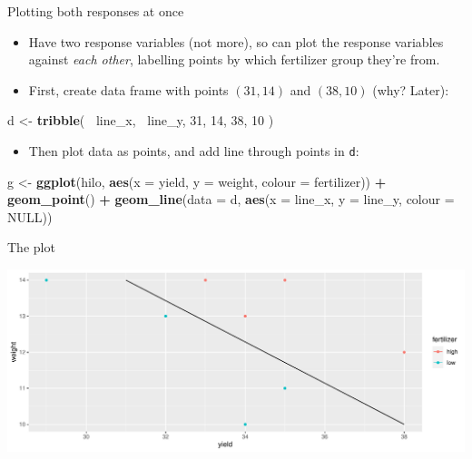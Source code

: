 \documentclass[
  ignorenonframetext,
]{beamer}
\newenvironment{Shaded}{\begin{snugshade}}{\end{snugshade}}
\newcommand{\DataTypeTok}[1]{\textcolor[rgb]{0.13,0.29,0.53}{#1}}
\newcommand{\DecValTok}[1]{\textcolor[rgb]{0.00,0.00,0.81}{#1}}
\newcommand{\KeywordTok}[1]{\textcolor[rgb]{0.13,0.29,0.53}{\textbf{#1}}}
\newcommand{\NormalTok}[1]{#1}
\newcommand{\OperatorTok}[1]{\textcolor[rgb]{0.81,0.36,0.00}{\textbf{#1}}}
\newcommand{\OtherTok}[1]{\textcolor[rgb]{0.56,0.35,0.01}{#1}}
\newcommand{\StringTok}[1]{\textcolor[rgb]{0.31,0.60,0.02}{#1}}
\providecommand{\tightlist}{%
  \setlength{\itemsep}{0pt}\setlength{\parskip}{0pt}}
\begin{document}
\begin{frame}[fragile]{Plotting both responses at once}
\protect\hypertarget{plotting-both-responses-at-once}{}

\begin{itemize}
\item
  Have two response variables (not more), so can plot the response
  variables against \emph{each other}, labelling points by which
  fertilizer group they're from.
\item
  First, create data frame with points \((31,14)\) and \((38,10)\) (why?
  Later):
\end{itemize}

\begin{Shaded}
\begin{Highlighting}[]
\NormalTok{d <-}\StringTok{ }\KeywordTok{tribble}\NormalTok{(}
  \OperatorTok{~}\NormalTok{line_x, }\OperatorTok{~}\NormalTok{line_y,}
  \DecValTok{31}\NormalTok{, }\DecValTok{14}\NormalTok{,}
  \DecValTok{38}\NormalTok{, }\DecValTok{10}
\NormalTok{)}
\end{Highlighting}
\end{Shaded}

\begin{itemize}
\tightlist
\item
  Then plot data as points, and add line through points in \texttt{d}:
\end{itemize}

\begin{Shaded}
\begin{Highlighting}[]
\NormalTok{g <-}\StringTok{ }\KeywordTok{ggplot}\NormalTok{(hilo, }\KeywordTok{aes}\NormalTok{(}\DataTypeTok{x =}\NormalTok{ yield, }\DataTypeTok{y =}\NormalTok{ weight,}
                      \DataTypeTok{colour =}\NormalTok{ fertilizer)) }\OperatorTok{+}\StringTok{ }\KeywordTok{geom_point}\NormalTok{() }\OperatorTok{+}
\StringTok{  }\KeywordTok{geom_line}\NormalTok{(}\DataTypeTok{data =}\NormalTok{ d,}
            \KeywordTok{aes}\NormalTok{(}\DataTypeTok{x =}\NormalTok{ line_x, }\DataTypeTok{y =}\NormalTok{ line_y, }\DataTypeTok{colour =} \OtherTok{NULL}\NormalTok{))}
\end{Highlighting}
\end{Shaded}

\end{frame}

\begin{frame}{The plot}
\protect\hypertarget{the-plot-6}{}

\includegraphics{slides_d29_files/figure-beamer/charlecombe-1.pdf}

\end{frame}
\end{document}

